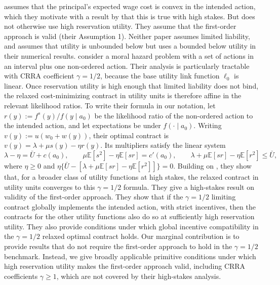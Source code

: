 \textcite{castro2024disentangling} assumes that the principal's expected wage cost is convex in the intended action, which they motivate with a result by \textcite{chade2020highstakes} that this is true with high stakes. But \textcite{castro2024disentangling} does not otherwise use high reservation utility. They assume that the first-order approach is valid (their Assumption 1). Neither paper assumes limited liability, and \textcite{castro2024disentangling} assumes that utility is unbounded below but uses a bounded below utility in their numerical results. \textcite{chade2026initiative} consider a moral hazard problem with a set of actions in an interval plus one non-ordered action. Their analysis is particularly tractable with CRRA coefficient $\gamma=1/2$, because the base utility link function $\ell_0$ is linear. Once reservation utility is high enough that limited liability does not bind, the relaxed cost-minimizing contract in utility units is therefore affine in the relevant likelihood ratios. To write their formula in our notation, let $r(y):=f^s(y)/f(y\mid a_0)$ be the likelihood ratio of the non-ordered action to the intended action, and let expectations be under $f(\cdot\mid a_0)$. Writing $v(y):=u(w_0+w(y))$, their optimal contract is $v(y)=\lambda+\mu s(y)-\eta r(y)$. Its multipliers satisfy the linear system
\[
    \lambda-\eta=\bar U+c(a_0),\qquad
    \mu\mathbb E[s^2]-\eta\mathbb E[sr]=c'(a_0),\qquad
    \lambda+\mu\mathbb E[sr]-\eta\mathbb E[r^2]\leq\bar U,
\]
where $\eta\geq0$ and $\eta\{\bar U-[\lambda+\mu\mathbb E[sr]-\eta\mathbb E[r^2]]\}=0$. Building on \textcite{chade2020highstakes}, they show that, for a broader class of utility functions at high stakes, the relaxed contract in utility units converges to this $\gamma=1/2$ formula. They give a high-stakes result on validity of the first-order approach. They show that if the $\gamma=1/2$ limiting contract globally implements the intended action, with strict incentives, then the contracts for the other utility functions also do so at sufficiently high reservation utility. They also provide conditions under which global incentive compatibility in the $\gamma=1/2$ relaxed optimal contract holds. Our marginal contribution is to provide results that do not require the first-order approach to hold in the $\gamma=1/2$ benchmark. Instead, we give broadly applicable primitive conditions under which high reservation utility makes the first-order approach valid, including CRRA coefficients $\gamma\geq1$, which are not covered by their high-stakes analysis.

